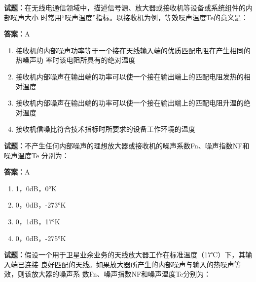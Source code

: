 \documentclass{ctexbook}
\begin{document}
\vspace{1em}

\textbf{试题：}在无线电通信领域中，描述信号源、放大器或接收机等设备或系统组件的内部噪声大小
时常用“噪声温度”指标。以接收机为例，等效噪声温度Te的意义是： 

\textbf{答案：}A 

\begin{enumerate}[leftmargin=3em]
  \item 接收机的内部噪声功率等于一个接在天线输入端的优质匹配电阻在产生相同的热噪声功
率时该电阻所具有的绝对温度 

  \item 接收机内部噪声在输出端的功率可以使一个接在输出端上的匹配电阻发热的相对温度 

  \item 接收机内部噪声在输出端的功率可以使一个接在输出端上的匹配电阻升温的绝对温度 

  \item 接收机信噪比符合技术指标时所要求的设备工作环境的温度 

\end{enumerate}





\vspace{1em}

\textbf{试题：}不产生任何内部噪声的理想放大器或接收机的噪声系数Fn、噪声指数NF和噪声温度Te
分别为： 

\textbf{答案：}A 

\begin{enumerate}[leftmargin=3em]
  \item 1，0dB，0°K 

  \item 0，0dB，-273°K 

  \item 0，1dB，17°K 

  \item 0，0dB，-275°K 


\end{enumerate}





\vspace{1em}

\textbf{试题：}假设一个用于卫星业余业务的天线放大器工作在标准温度（17℃）下，其输入端已连接
良好匹配的天线。如果放大器所产生的内部噪声与输入的热噪声等效，则该放大器的噪声系
数Fn、噪声指数NF和噪声温度Te分别为： 
\end{document}
